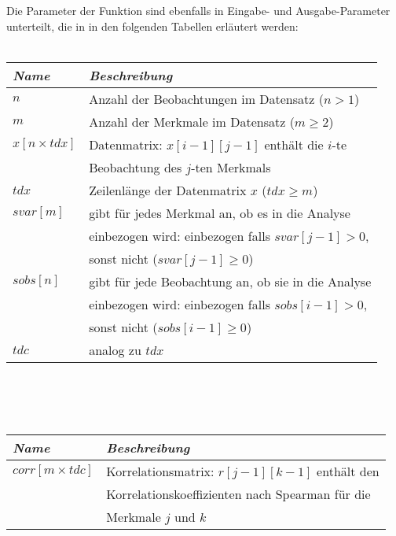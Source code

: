 \noindent Die Parameter der Funktion sind ebenfalls in Eingabe- und Ausgabe-Parameter unterteilt, die in in den folgenden Tabellen erläutert werden:\\

\\

\noindent \begin{tabular}[ht]{|l|l|}
  	\hline
  	\textit{Name} & \textit{Beschreibung}\\
  	\hline \hline
  	$n$ & Anzahl der Beobachtungen im Datensatz ($n > 1$)\\ \hline
  	$m$ & Anzahl der Merkmale im Datensatz ($m \geq 2$)\\ \hline
	$x[n \times tdx]$ & Datenmatrix: $x[i - 1][j - 1]$ enthält die $i$-te\\
	& Beobachtung des $j$-ten Merkmals\\ \hline
	$tdx$ & Zeilenlänge der Datenmatrix $x$ ($tdx \geq m$)\\ \hline
	$svar[m]$ & gibt für jedes Merkmal an, ob es in die Analyse\\
	& einbezogen wird: einbezogen falls $svar[j-1] > 0$,\\
	& sonst nicht ($svar[j-1] \geq 0$)\\ \hline
	$sobs[n]$ & gibt für jede Beobachtung an, ob sie in die Analyse\\
	& einbezogen wird:  einbezogen falls $sobs[i-1] > 0$, \\
	& sonst nicht ($sobs[i-1] \geq 0$)\\ \hline
	$tdc$ & analog zu $tdx$\\
	\hline
\end{tabular}\\\\

\\
	
\noindent \begin{tabular}[ht]{|l|l|}
  	\hline
  	\textit{Name} & \textit{Beschreibung}\\
  	\hline \hline
  	$corr[m \times tdc]$ & Korrelationsmatrix: $r[j - 1][k - 1]$ enthält den\\
	& Korrelationskoeffizienten nach Spearman für die\\
	& Merkmale $j$ und $k$\\
  	\hline
\end{tabular}\\\\

